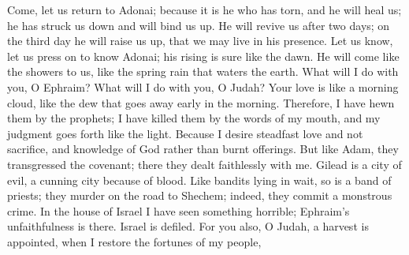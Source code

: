 \begin{biblechapter} %
 Come, let us return to Adonai; 
because it is he who has torn, and he will heal us; 
he has struck us down and will bind us up.
\verse He will revive us after two days; 
on the third day he will raise us up, 
that we may live in his presence.
\verse Let us know, let us press on to know Adonai; 
his rising is sure like the dawn. 
He will come like the showers to us, 
like the spring rain that waters the earth.
\verse What will I do with you, O Ephraim? 
What will I do with you, O Judah? 
Your love is like a morning cloud, 
like the dew that goes away early in the morning.
\verse Therefore, I have hewn them by the prophets; 
I have killed them by the words of my mouth, 
and my judgment goes forth like the light.
\verse Because I desire steadfast love and not sacrifice, 
and knowledge of God rather than burnt offerings.
\verse But like Adam, they transgressed the covenant; 
there they dealt faithlessly with me.
\verse Gilead is a city of evil, 
a cunning city because of blood.
\verse Like bandits lying in wait, 
so is a band of priests; 
they murder on the road to Shechem; 
indeed, they commit a monstrous crime.
\verse In the house of Israel I have seen something horrible; 
Ephraim’s unfaithfulness is there. 
Israel is defiled.
 For you also, O Judah, a harvest is appointed, 
when I restore the fortunes of my people,
\end{biblechapter}

